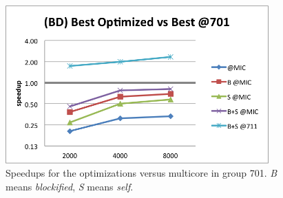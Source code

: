 \documentclass[../thesis]{subfiles}
\begin{document}
	\begin{figure}[p]
		\begin{center}
			\includegraphics[width=0.9\textwidth]{assets/images/mic/optims/best-speedup.png}
		\end{center}
		\caption{Speedups for the optimizations versus multicore in group 701. \emph{B} means \emph{blockified}, \emph{S} means \emph{self}.}
		\label{fig:mic:optims:best:speedup}
	\end{figure}
\end{document}

